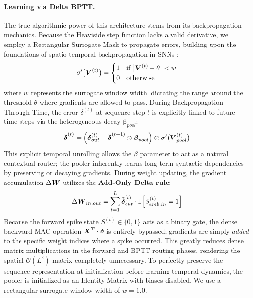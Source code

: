\documentclass[runningheads]{llncs}
\begin{document}
\paragraph{Learning via Delta BPTT.} The true algorithmic power of this architecture stems from its backpropagation mechanics. Because the Heaviside step function lacks a valid derivative, we employ a Rectangular Surrogate Mask to propagate errors, building upon the foundations of spatio-temporal backpropagation in SNNs \cite{neftci2019surrogate}:
\begin{equation}
\sigma'\big(\boldsymbol{V}^{(t)}\big) = \begin{cases} 1 & \text{if } \big|\boldsymbol{V}^{(t)} - \theta\big| < w \\ 0 & \text{otherwise} \end{cases}
\end{equation}
where $w$ represents the surrogate window width, dictating the range around the threshold $\theta$ where gradients are allowed to pass. During Backpropagation Through Time, the error $\delta^{(t)}$ at sequence step $t$ is explicitly linked to future time steps via the heterogeneous decay $\bm{\beta}_{pool}$:
\begin{equation}
\tilde{\boldsymbol{\delta}}^{(t)} = \left( \boldsymbol{\delta}_{out}^{(t)} + \tilde{\boldsymbol{\delta}}^{(t+1)} \odot \boldsymbol{\beta}_{pool} \right) \odot \sigma'\big(\boldsymbol{V}_{pool}^{(t)}\big)
\end{equation}
This explicit temporal unrolling allows the $\beta$ parameter to act as a natural contextual router; the pooler inherently learns long-term syntactic dependencies by preserving or decaying gradients. During weight updating, the gradient accumulation $\Delta \boldsymbol{W}$ utilizes the \textbf{Add-Only Delta rule}:
\begin{equation}
\Delta \boldsymbol{W}_{in, out} = \sum_{t=1}^{L} \tilde{\boldsymbol{\delta}}^{(t)}_{out} \cdot \mathbb{I}\left[ S_{emb, in}^{(t)} = 1 \right]
\end{equation}
Because the forward spike state $S^{(t)} \in \{0, 1\}$ acts as a binary gate, the dense backward MAC operation $\boldsymbol{X}^T \cdot \boldsymbol{\delta}$ is entirely bypassed; gradients are simply \textit{added} to the specific weight indices where a spike occurred. This greatly reduces dense matrix multiplications in the forward and BPTT routing phases, rendering the spatial $\mathcal{O}(L^2)$ matrix completely unnecessary. To perfectly preserve the sequence representation at initialization before learning temporal dynamics, the pooler is initialized as an Identity Matrix with biases disabled. We use a rectangular surrogate window width of $w=1.0$.
\end{document}
